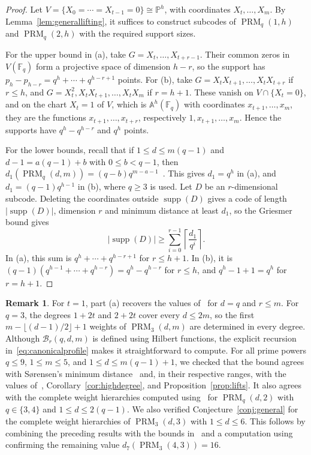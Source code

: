 \documentclass[11pt]{amsart}
\theoremstyle{definition}
\newtheorem{remark}[theorem]{Remark}
\newcommand{\F}{\mathbb F}
\newcommand{\PP}{\mathbb P}
\newcommand{\Aff}{\mathbb A}
\newcommand{\PRM}{\operatorname{PRM}}
\newcommand{\supp}{\operatorname{supp}}
\newcommand{\card}[1]{\left|#1\right|}
\numberwithin{equation}{section}
\begin{document}
\begin{proof}
Let $V=\{X_0=\cdots=X_{t-1}=0\}\cong\PP^h$, with coordinates
$X_t,\ldots,X_m$. By Lemma~\ref{lem:generallifting}, it suffices
to construct subcodes of $\PRM_q(1,h)$
and $\PRM_q(2,h)$ with the required support sizes.

For the upper bound in (a), take $G=X_t,\ldots,X_{t+r-1}$. Their common
zeros in $V(\F_q)$ form a projective space of dimension $h-r$, so the support has $p_h-p_{h-r}=q^h+\cdots+q^{h-r+1}$
points. For (b), take $G=X_tX_{t+1},\ldots,X_tX_{t+r}$ if $r\le h$, and
$G=X_t^2,X_tX_{t+1},\ldots,X_tX_m$ if $r=h+1$. These vanish on
$V\cap\{X_t=0\}$, and on the chart $X_t=1$ of $V$, which is
$\Aff^h(\F_q)$ with coordinates $x_{t+1},\ldots,x_m$, they are the
functions $x_{t+1},\ldots,x_{t+r}$, respectively $1,x_{t+1},\ldots,x_m$.
Hence the supports have $q^h-q^{h-r}$ and $q^h$ points.

For the lower bounds, recall that if $1\le d\le m(q-1)$ and
$d-1=a(q-1)+b$ with $0\le b<q-1$, then
$d_1(\PRM_q(d,m))=(q-b)q^{m-a-1}$~\cite{Sorensen}. This gives $d_1=q^h$
in (a), and $d_1=(q-1)q^{h-1}$ in (b), where $q\ge3$ is used. Let $D$ be
an $r$-dimensional subcode. Deleting the coordinates outside $\supp(D)$
gives a code of length $\card{\supp(D)}$, dimension $r$ and minimum
distance at least $d_1$, so the Griesmer bound gives
\[
 \card{\supp(D)}\ge\sum_{i=0}^{r-1}\left\lceil\frac{d_1}{q^i}\right\rceil.
\]
In (a), this sum is $q^h+\cdots+q^{h-r+1}$ for $r\le h+1$. In (b), it is
$(q-1)(q^{h-1}+\cdots+q^{h-r})=q^h-q^{h-r}$ for $r\le h$, and
$q^h-1+1=q^h$ for $r=h+1$.
\end{proof}


\begin{remark}
For $t=1$, part (a) recovers the values of~\cite[Sec.~6]{BDG18} for $d=q$
and $r\le m$. For $q=3$, the degrees $1+2t$ and $2+2t$ cover every
$d\le 2m$, so the first $m-\lfloor (d-1)/2\rfloor+1$ weights of
$\PRM_3(d,m)$ are determined in every degree. Although $\mathcal B_r(q,d,m)$ is defined using Hilbert functions,
the explicit recursion in~\eqref{eq:canonicalprofile} makes it
straightforward to compute.
For all prime powers $q\le9$, $1\le m\le5$, and
$1\le d\le m(q-1)+1$, we checked that the bound agrees with
S{\o}rensen's minimum distance~\cite{Sorensen} and, in their
respective ranges, with the values of~\cite[Sec.~6]{BDG18},
Corollary~\ref{cor:highdegree}, and Proposition~\ref{prop:lifts}.
It also agrees with the complete weight hierarchies computed
using~\cite{sanjoseGHWsPackage} for $\PRM_q(d,2)$ with
$q\in\{3,4\}$ and $1\le d\le2(q-1)$. We also verified Conjecture~\ref{conj:general} for the complete
weight hierarchies of $\PRM_3(d,3)$ with $1\le d\le6$.
This follows by combining the preceding results with the bounds
in~\cite[Tables~3 and~6]{SanJose} and a computation
using~\cite{sanjoseGHWsPackage} confirming the remaining value
$d_7(\PRM_3(4,3))=16$.
\end{remark}
\end{document}
